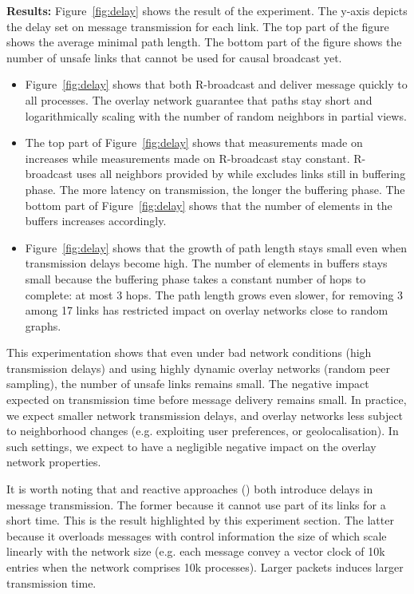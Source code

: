 \noindent \textbf{Results:} Figure~\ref{fig:delay} shows the result of the
experiment. The y-axis depicts the delay set on message transmission for each
link. The top part of the figure shows the average minimal path length. The
bottom part of the figure shows the number of unsafe links that cannot be used 
for causal broadcast yet.
\begin{itemize}[leftmargin=*]
\item Figure~\ref{fig:delay} shows that both R-broadcast and \CBROADCAST deliver
  message quickly to all processes. The overlay network guarantee that paths
  stay short and logarithmically scaling with the number of random neighbors in
  partial views.
\item The top part of Figure~\ref{fig:delay} shows that measurements made on
  \CBROADCAST increases while measurements made on R-broadcast stay
  constant. R-broadcast uses all neighbors provided by \SPRAY while \CBROADCAST
  excludes links still in buffering phase. The more latency on transmission, the
  longer the buffering phase. The bottom part of Figure~\ref{fig:delay} shows
  that the number of elements in the buffers increases accordingly.
\item Figure~\ref{fig:delay} shows that the growth of path length stays small
  even when transmission delays become high. The number of elements in buffers
  stays small because the buffering phase takes a constant number of hops to
  complete: at most 3 hops. The path length grows even slower, for removing 3
  among 17 links has restricted impact on overlay networks close to random
  graphs.
\end{itemize}

This experimentation shows that even under bad network conditions (high
transmission delays) and using highly dynamic overlay networks (random peer
sampling), the number of unsafe links remains small. The negative impact
expected on transmission time before message delivery remains small. In
practice, we expect smaller network transmission delays, and overlay networks
less subject to neighborhood changes (e.g. exploiting user preferences, or
geolocalisation). In such settings, we expect \CBROADCAST to have a negligible
negative impact on the overlay network properties. 

It is worth noting that \CBROADCAST and reactive approaches (\REF) both
introduce delays in message transmission. The former because it cannot use part
of its links for a short time. This is the result highlighted by this experiment
section.  The latter because it overloads messages with control information the
size of which scale linearly with the network size (e.g. each message convey a
vector clock of 10k entries when the network comprises 10k processes).  Larger
packets induces larger transmission time. 


